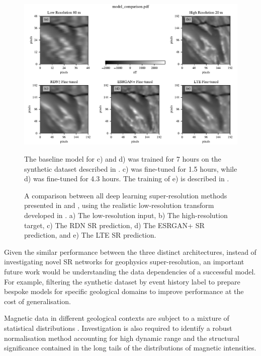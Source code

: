 \begin{landscape}
    \begin{figure}[hbtp]
        \includegraphics[width=\linewidth,trim={0 0 0 5mm},clip]{fig/etc/model_comparison_v2.pdf}
        \caption[Comparison between the three SR architectures]{
            A comparison between all deep learning super-resolution methods presented in  and , using the realistic low-resolution transform developed in .
            a) The low-resolution input, b) The high-resolution target, c) The RDN\textdaggerdbl{} SR prediction, d) The ESRGAN+ SR prediction, and e) The LTE SR prediction.}
        The baseline model for c) and d) was trained for 7 hours on the synthetic dataset described in .
        c) was fine-tuned for 1.5 hours, while d) was fine-tuned for 4.3 hours.
        The training of e) is described in .
        \label{fig:modcomp}
    \end{figure}
\end{landscape}

Given the similar performance between the three distinct architectures, instead of investigating novel SR networks for geophysics super-resolution, an important future work would be understanding the data dependencies of a successful model. For example, filtering the synthetic dataset by event history label to prepare bespoke models for specific geological domains to improve performance at the cost of generalisation.

Magnetic data in different geological contexts are subject to a mixture of statistical distributions \parencite{khokhlovCauseNonGaussianDistribution2017}. Investigation is also required to identify a robust normalisation method accounting for high dynamic range and the structural significance contained in the long tails of the distributions of magnetic intensities.

